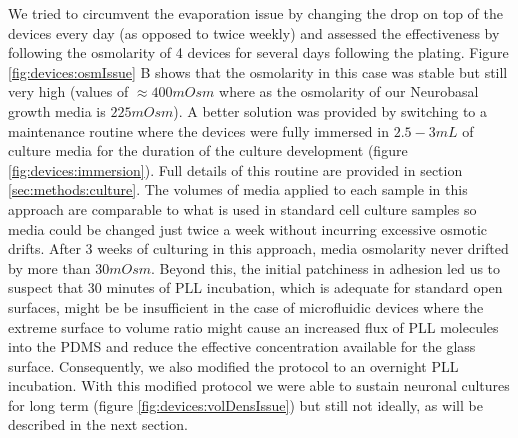         We tried to circumvent the evaporation issue by changing the drop on top of the devices every day (as opposed to twice weekly) and assessed the effectiveness by following the osmolarity of 4 devices for several days following the plating. Figure \ref{fig:devices:osmIssue} B shows that the osmolarity in this case was stable but still very high (values of \(\approx 400mOsm\) where as the osmolarity of our Neurobasal growth media is \(225 mOsm\)). A better solution was provided by switching to a maintenance routine where the devices were fully immersed in \(2.5-3 mL\) of culture media for the duration of the culture development (figure \ref{fig:devices:immersion}). Full details of this routine are provided in section \ref{sec:methods:culture}. The volumes of media applied to each sample in this approach are comparable to what is used in standard cell culture samples so media could be changed just twice a week without incurring excessive osmotic drifts. After 3 weeks of culturing in this approach, media osmolarity never drifted by more than \(30 mOsm\). Beyond this, the initial patchiness in adhesion led us to suspect that 30 minutes of PLL incubation, which is adequate for standard open surfaces, might be be insufficient in the case of microfluidic devices where the extreme surface to volume ratio might cause an increased flux of PLL molecules into the PDMS and reduce the effective concentration available for the glass surface. Consequently, we also modified the protocol to an overnight PLL incubation. With this modified protocol we were able to sustain neuronal cultures for long term (figure \ref{fig:devices:volDensIssue}) but still not ideally, as will be described in the next section.




